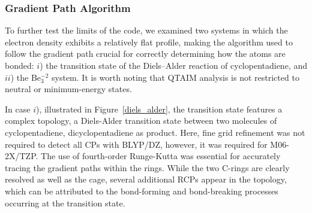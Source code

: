 \subsubsection{Gradient Path Algorithm}

To further test the limits of the code, we examined two systems in which the
electron density exhibits a relatively flat profile, making the algorithm used
to follow the gradient path crucial for correctly determining how the atoms are
bonded: $i$) the transition state of the Diels–Alder reaction of
cyclopentadiene, and  $ii$) the Be$_3^{-2}$ system. It is worth noting that
\gls{QTAIM} analysis is not restricted to neutral or minimum-energy states.

In case $i$), illustrated in Figure~\ref{diels_alder}, the transition state
features a complex topology, a Diels-Alder transition state between two
molecules of cyclopentadiene, dicyclopentadiene as product. Here, fine grid
refinement was not required to detect all \glspl{CP} with BLYP/DZ,
however, it was required for M06-2X/TZP. The use of fourth-order
Runge-Kutta was essential for accurately tracing the gradient paths within the
rings. While the two C-rings are clearly resolved as well as the cage, several
additional \glspl{RCP} appear in the topology, which can be attributed to the
bond-forming and bond-breaking processes occurring at the transition state.

